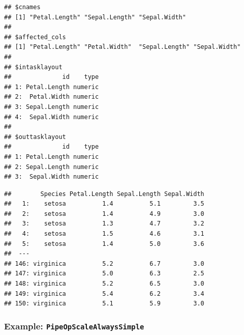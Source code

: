 \documentclass[]{scrbook}
\newenvironment{Shaded}{\begin{snugshade}}{\end{snugshade}}
\newcommand{\DecValTok}[1]{\textcolor[rgb]{0.00,0.00,0.81}{#1}}
\newcommand{\KeywordTok}[1]{\textcolor[rgb]{0.13,0.29,0.53}{\textbf{#1}}}
\newcommand{\NormalTok}[1]{#1}
\newcommand{\OperatorTok}[1]{\textcolor[rgb]{0.81,0.36,0.00}{\textbf{#1}}}
\newcommand{\StringTok}[1]{\textcolor[rgb]{0.31,0.60,0.02}{#1}}
\renewenvironment{Shaded} {\begin{snugshade}\small} {\end{snugshade}}
\begin{document}
\begin{Shaded}
\end{Shaded}

\begin{verbatim}
## $cnames
## [1] "Petal.Length" "Sepal.Length" "Sepal.Width" 
## 
## $affected_cols
## [1] "Petal.Length" "Petal.Width"  "Sepal.Length" "Sepal.Width" 
## 
## $intasklayout
##              id    type
## 1: Petal.Length numeric
## 2:  Petal.Width numeric
## 3: Sepal.Length numeric
## 4:  Sepal.Width numeric
## 
## $outtasklayout
##              id    type
## 1: Petal.Length numeric
## 2: Sepal.Length numeric
## 3:  Sepal.Width numeric
\end{verbatim}

\begin{Shaded}
\end{Shaded}

\begin{verbatim}
##        Species Petal.Length Sepal.Length Sepal.Width
##   1:    setosa          1.4          5.1         3.5
##   2:    setosa          1.4          4.9         3.0
##   3:    setosa          1.3          4.7         3.2
##   4:    setosa          1.5          4.6         3.1
##   5:    setosa          1.4          5.0         3.6
##  ---                                                
## 146: virginica          5.2          6.7         3.0
## 147: virginica          5.0          6.3         2.5
## 148: virginica          5.2          6.5         3.0
## 149: virginica          5.4          6.2         3.4
## 150: virginica          5.1          5.9         3.0
\end{verbatim}

\hypertarget{example-pipeopscalealwayssimple}{%
\subsubsection{\texorpdfstring{Example: \texttt{PipeOpScaleAlwaysSimple}}{Example: PipeOpScaleAlwaysSimple}}\label{example-pipeopscalealwayssimple}}
\end{document}
